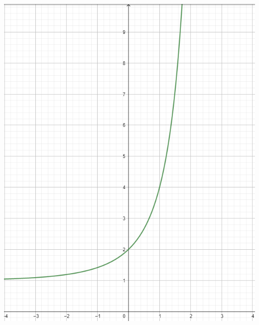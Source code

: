 \documentclass{article}
\begin{document}
\includegraphics[scale = 0.4]{2tothe2totheN}
\newline
\newline
\newline
\end{document}
